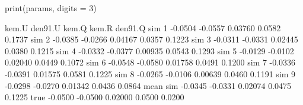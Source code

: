 \begin{Schunk}
\begin{Sinput}
 print(params, digits = 3)
\end{Sinput}
\begin{Soutput}
           kem.U den91.U   kem.Q  kem.R den91.Q
sim 1    -0.0504 -0.0557 0.03760 0.0582  0.1737
sim 2    -0.0385 -0.0266 0.04167 0.0357  0.1223
sim 3    -0.0311 -0.0331 0.02445 0.0380  0.1215
sim 4    -0.0332 -0.0377 0.00935 0.0543  0.1293
sim 5    -0.0129 -0.0102 0.02040 0.0449  0.1072
sim 6    -0.0548 -0.0580 0.01758 0.0491  0.1200
sim 7    -0.0336 -0.0391 0.01575 0.0581  0.1225
sim 8    -0.0265 -0.0106 0.00639 0.0460  0.1191
sim 9    -0.0298 -0.0270 0.01342 0.0436  0.0864
mean sim -0.0345 -0.0331 0.02074 0.0475  0.1225
true     -0.0500 -0.0500 0.02000 0.0500  0.0200
\end{Soutput}
\end{Schunk}
